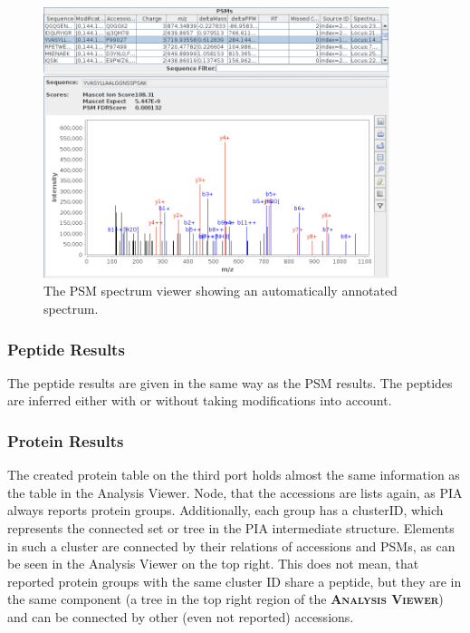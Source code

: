 \documentclass[a4paper,11pt,twoside]{article}
\newcommand{\menu}[1]{{\scshape\bfseries #1}}
\begin{document}
\begin{figure}[ht!]
	\centering
	\includegraphics[width=0.9\textwidth]{graphics/screenshot_PSM_spectrum_viewer}
	\caption{The PSM spectrum viewer showing an automatically annotated
	spectrum.}
	\label{pia_psm_spectrum_viewer}
\end{figure}


\subsubsection{Peptide Results}

The peptide results are given in the same way as the PSM results. The peptides
are inferred either with or without taking modifications into account.


\subsubsection{Protein Results}

The created protein table on the third port holds almost the same information
as the table in the Analysis Viewer. Node, that the accessions are lists again,
as PIA always reports protein groups. Additionally, each group has a clusterID,
which represents the connected set or tree in the PIA intermediate structure.
Elements in such a cluster are connected by their relations of accessions and
PSMs, as can be seen in the Analysis Viewer on the top right. This does not
mean, that reported protein groups with the same cluster ID share a peptide,
but they are in the same component (a tree in the top right region of the
\menu{Analysis Viewer}) and can be connected by other (even not reported)
accessions.
\end{document}
